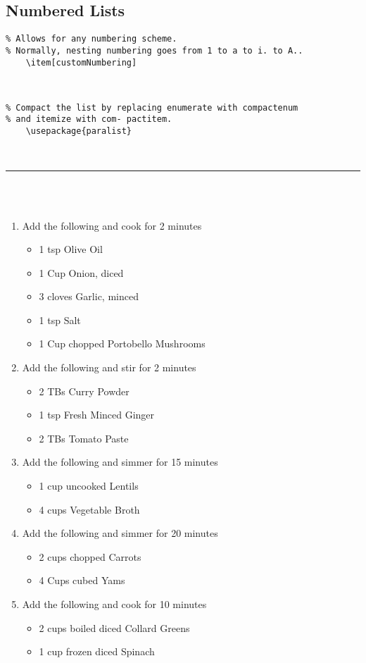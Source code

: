 \documentclass[a4paper,12pt,titlepage]{article}
\begin{document}
\subsection{Numbered Lists}\hspace*{\fill}
\begin{lstlisting}
% Allows for any numbering scheme.
% Normally, nesting numbering goes from 1 to a to i. to A..
	\item[customNumbering]
\end{lstlisting}
~\\
\begin{lstlisting}
% Compact the list by replacing enumerate with compactenum 
% and itemize with com- pactitem.
	\usepackage{paralist}
\end{lstlisting}
~\\
\rule{\linewidth}{0.1mm}
\\
\\
\hspace*{6mm}{\large Perfect Meal Recipe}
\begin{enumerate}[label=\Roman*, font=\bfseries, leftmargin=+.7in]
	\item Add the following and cook for 2 minutes
	\begin{itemize}
		\item 1 tsp Olive Oil
		\item 1 Cup Onion, diced
		\item 3 cloves Garlic, minced
		\item 1 tsp Salt
		\item 1 Cup chopped Portobello Mushrooms
	\end{itemize}
	\item Add the following and stir for 2 minutes
	\begin{itemize}
		\item 2 TBs Curry Powder
		\item 1 tsp Fresh Minced Ginger
		\item 2 TBs Tomato Paste
	\end{itemize}
	\item Add the following and simmer for 15 minutes
	\begin{itemize}
		\item 1 cup uncooked Lentils
		\item 4 cups Vegetable Broth
	\end{itemize}
	\item Add the following and simmer for 20 minutes
	\begin{itemize}
		\item 2 cups chopped Carrots
		\item 4 Cups cubed Yams
	\end{itemize}
	\item Add the following and cook for 10 minutes
	\begin{itemize}
		\item 2 cups boiled diced Collard Greens
		\item 1 cup frozen diced Spinach
	\end{itemize}
\end{enumerate}
\end{document}
